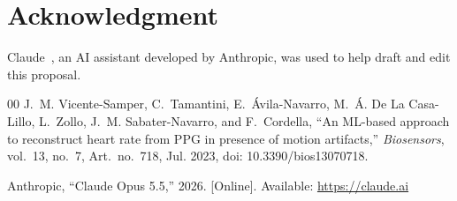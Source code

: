 \documentclass[conference]{IEEEtran}
\begin{document}
\section*{Acknowledgment}
Claude~\cite{claude2026}, an AI assistant developed by Anthropic, was used to help draft and edit this proposal.

\begin{thebibliography}{00}
J.~M. Vicente-Samper, C.~Tamantini, E.~\'{A}vila-Navarro, M.~\'{A}. De La Casa-Lillo, L.~Zollo, J.~M. Sabater-Navarro, and F.~Cordella, ``An ML-based approach to reconstruct heart rate from PPG in presence of motion artifacts,'' \textit{Biosensors}, vol.~13, no.~7, Art.~no.~718, Jul. 2023, doi: 10.3390/bios13070718.

Anthropic, ``Claude Opus 5.5,'' 2026. [Online]. Available: \url{https://claude.ai}
\end{thebibliography}
\end{document}
